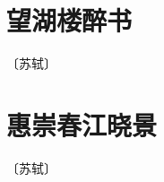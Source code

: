 \documentclass[12pt,UTF-8,openany]{ctexbook}
\begin{document}
\vspace{8pt}


\section{望湖楼醉书}

\begin{center}
    \vspace{10pt}
    
    \begin{normalsize}
        
        〔苏轼〕
        
    \end{normalsize}
    
    \vspace{8pt}
    
    \begin{large}
        
        
        
    \end{large}
    
\end{center}

\vspace{8pt}


\section{惠崇春江晓景}

\begin{center}
    \vspace{10pt}
    
    \begin{normalsize}
        
        〔苏轼〕
        
    \end{normalsize}
    
    \vspace{8pt}
    
    \begin{large}
        
        
        
    \end{large}
    
\end{center}
\end{document}
